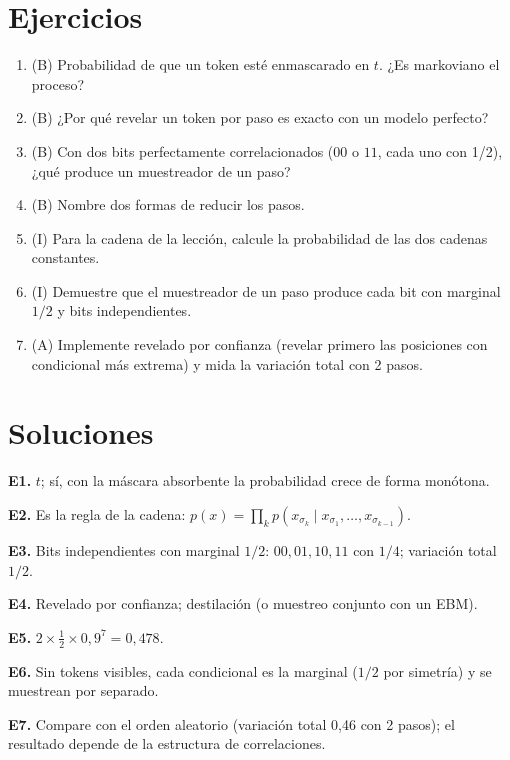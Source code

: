 \documentclass[11pt,a4paper]{article}
\begin{document}
\section{Ejercicios}
\begin{enumerate}[label=\textbf{E\arabic*.}]
\item (B) Probabilidad de que un token esté enmascarado en $t$. ¿Es markoviano el proceso?
\item (B) ¿Por qué revelar un token por paso es exacto con un modelo perfecto?
\item (B) Con dos bits perfectamente correlacionados ($00$ o $11$, cada uno con 1/2), ¿qué produce un muestreador de un paso?
\item (B) Nombre dos formas de reducir los pasos.
\item (I) Para la cadena de la lección, calcule la probabilidad de las dos cadenas constantes.
\item (I) Demuestre que el muestreador de un paso produce cada bit con marginal $1/2$ y bits independientes.
\item (A) Implemente revelado por confianza (revelar primero las posiciones con condicional más extrema) y mida la variación total con 2 pasos.
\end{enumerate}
\section{Soluciones}
\begin{solucion}
\textbf{E1.} $t$; sí, con la máscara absorbente la probabilidad crece de forma monótona.

\textbf{E2.} Es la regla de la cadena: $p(x)=\prod_kp(x_{\sigma_k}\mid x_{\sigma_1},\dots,x_{\sigma_{k-1}})$.

\textbf{E3.} Bits independientes con marginal $1/2$: $00,01,10,11$ con $1/4$; variación total $1/2$.

\textbf{E4.} Revelado por confianza; destilación (o muestreo conjunto con un EBM).

\textbf{E5.} $2\times\frac12\times0{,}9^7=0{,}478$.

\textbf{E6.} Sin tokens visibles, cada condicional es la marginal ($1/2$ por simetría) y se muestrean por separado.

\textbf{E7.} Compare con el orden aleatorio (variación total 0,46 con 2 pasos); el resultado depende de la estructura de correlaciones.
\end{solucion}
\end{document}
